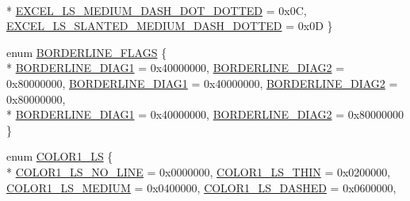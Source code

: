 \begin{DoxyCompactItemize}
\\*
\hyperlink{namespace_excel_format_af723db0cf2ef2243e273dcf782c51355a8ed3f5562f39304089a5dd2457bcb142}{E\+X\+C\+E\+L\+\_\+\+L\+S\+\_\+\+M\+E\+D\+I\+U\+M\+\_\+\+D\+A\+S\+H\+\_\+\+D\+O\+T\+\_\+\+D\+O\+T\+T\+E\+D} = 0x0\+C, 
\hyperlink{namespace_excel_format_af723db0cf2ef2243e273dcf782c51355a2d9b56207df417ac9f492f07141d64b3}{E\+X\+C\+E\+L\+\_\+\+L\+S\+\_\+\+S\+L\+A\+N\+T\+E\+D\+\_\+\+M\+E\+D\+I\+U\+M\+\_\+\+D\+A\+S\+H\+\_\+\+D\+O\+T\+T\+E\+D} = 0x0\+D
 \}
\item 
enum \hyperlink{namespace_excel_format_addb246db2721d76cfc19bec63b35636d}{B\+O\+R\+D\+E\+R\+L\+I\+N\+E\+\_\+\+F\+L\+A\+G\+S} \{ \\*
\hyperlink{namespace_excel_format_addb246db2721d76cfc19bec63b35636daa9b024aeabd4ca6cafe75826d2678dd4}{B\+O\+R\+D\+E\+R\+L\+I\+N\+E\+\_\+\+D\+I\+A\+G1} = 0x40000000, 
\hyperlink{namespace_excel_format_addb246db2721d76cfc19bec63b35636da5c119b6147120b2d107e17961d48869c}{B\+O\+R\+D\+E\+R\+L\+I\+N\+E\+\_\+\+D\+I\+A\+G2} = 0x80000000, 
\hyperlink{namespace_excel_format_addb246db2721d76cfc19bec63b35636daa9b024aeabd4ca6cafe75826d2678dd4}{B\+O\+R\+D\+E\+R\+L\+I\+N\+E\+\_\+\+D\+I\+A\+G1} = 0x40000000, 
\hyperlink{namespace_excel_format_addb246db2721d76cfc19bec63b35636da5c119b6147120b2d107e17961d48869c}{B\+O\+R\+D\+E\+R\+L\+I\+N\+E\+\_\+\+D\+I\+A\+G2} = 0x80000000, 
\\*
\hyperlink{namespace_excel_format_addb246db2721d76cfc19bec63b35636daa9b024aeabd4ca6cafe75826d2678dd4}{B\+O\+R\+D\+E\+R\+L\+I\+N\+E\+\_\+\+D\+I\+A\+G1} = 0x40000000, 
\hyperlink{namespace_excel_format_addb246db2721d76cfc19bec63b35636da5c119b6147120b2d107e17961d48869c}{B\+O\+R\+D\+E\+R\+L\+I\+N\+E\+\_\+\+D\+I\+A\+G2} = 0x80000000
 \}
\item 
enum \hyperlink{namespace_excel_format_a45a65c295872288f631aa19fece61482}{C\+O\+L\+O\+R1\+\_\+\+L\+S} \{ \\*
\hyperlink{namespace_excel_format_a45a65c295872288f631aa19fece61482a732d6c12133119f01ce71a4e521d12a0}{C\+O\+L\+O\+R1\+\_\+\+L\+S\+\_\+\+N\+O\+\_\+\+L\+I\+N\+E} = 0x0000000, 
\hyperlink{namespace_excel_format_a45a65c295872288f631aa19fece61482ac69cee9ed42a2e048be47c7e145ff5ed}{C\+O\+L\+O\+R1\+\_\+\+L\+S\+\_\+\+T\+H\+I\+N} = 0x0200000, 
\hyperlink{namespace_excel_format_a45a65c295872288f631aa19fece61482ada18d06b43be105fe2419d3567bad13b}{C\+O\+L\+O\+R1\+\_\+\+L\+S\+\_\+\+M\+E\+D\+I\+U\+M} = 0x0400000, 
\hyperlink{namespace_excel_format_a45a65c295872288f631aa19fece61482aea988924887ded252810338c5bba5026}{C\+O\+L\+O\+R1\+\_\+\+L\+S\+\_\+\+D\+A\+S\+H\+E\+D} = 0x0600000, 

\end{DoxyCompactItemize}
